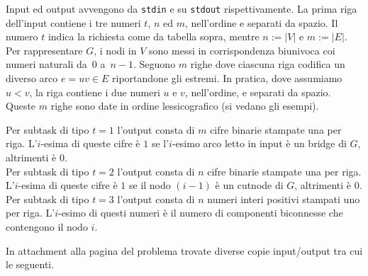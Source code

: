 
Input ed output avvengono da \verb'stdin' e su \verb'stdout' rispettivamente.
La prima riga dell'input contiene i tre numeri $t$, $n$ ed $m$, nell'ordine e separati da spazio. Il numero $t$ indica la richiesta come da tabella sopra, mentre $n:=|V|$ e $m:=|E|$. Per rappresentare $G$, i nodi in $V$ sono messi in corrispondenza biunivoca coi numeri naturali da~$0$ a~$n-1$.
Seguono $m$ righe dove ciascuna riga codifica un diverso arco $e=uv\in E$ riportandone gli estremi. In pratica, dove assumiamo $u < v$, la riga contiene i due numeri $u$ e $v$, nell'ordine, e separati da spazio.
Queste $m$ righe sono date in ordine lessicografico (si vedano gli esempi).

\indent
Per subtask di tipo $t=1$ l'output consta di $m$ cifre binarie stampate una per riga. L'$i$-esima di queste cifre è $1$ se l'$i$-esimo arco letto in input è un bridge di $G$, altrimenti è $0$.\\
\indent
Per subtask di tipo $t=2$ l'output consta di $n$ cifre binarie stampate una per riga. L'$i$-esima di queste cifre è $1$ se il nodo $(i-1)$ è un cutnode di $G$, altrimenti è $0$.\\
\indent
Per subtask di tipo $t=3$ l'output consta di $n$ numeri interi positivi stampati uno per riga. L'$i$-esimo di questi numeri è il numero di componenti biconnesse che contengono il nodo $i$. 



In attachment alla pagina del problema trovate diverse copie input/output tra cui le seguenti.

\vspace{0.5cm}

